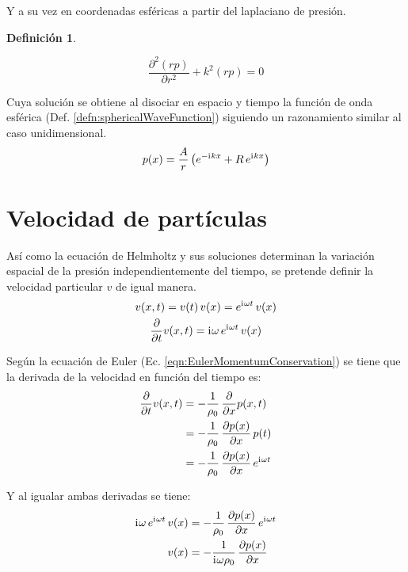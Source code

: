 \documentclass[a5paper,12pt,twoside]{book}
\newtheorem{defn}{{Definición}}[chapter]
\begin{document}
Y a su vez en coordenadas esféricas a partir del laplaciano de presión.

\begin{mdframed}[style=MyFrame1]
    \begin{defn}
        \label{defn:HelmholtzSpheric}
    \end{defn}
    \begin{equation*}
        \frac{\partial^2 (rp)}{\partial r^2} + k^2(rp) = 0
    \end{equation*}
\end{mdframed}

Cuya solución se obtiene al disociar en espacio y tiempo la función de onda esférica (Def. \ref{defn:sphericalWaveFunction}) siguiendo un razonamiento similar al caso unidimensional.
\begin{equation*}
    p(x) = \frac{A}{r} \left( e^{-\mathrm{i}\mkern1mu k x} + R \, e^{\mathrm{i}\mkern1mu k x} \right)
\end{equation*}


\section{Velocidad de partículas}

Así como la ecuación de Helmholtz y sus soluciones determinan la variación espacial de la presión independientemente del tiempo, se pretende definir la velocidad particular $v$ de igual manera.
\begin{gather*}
    v(x,t) = v(t) \, v(x) = e^{\mathrm{i}\mkern1mu \omega t} \, v(x)
    \\
    \frac{\partial}{\partial t} v(x,t) = \mathrm{i}\mkern1mu \omega \, e^{\mathrm{i}\mkern1mu \omega t} \, v(x)
\end{gather*}

Según la ecuación de Euler (Ec. \ref{eqn:EulerMomentumConservation}) se tiene que la derivada de la velocidad en función del tiempo es:
\begin{align*}
    \frac{\partial}{\partial t} v(x,t) &= - \frac{1}{\rho_0} \, \frac{\partial}{\partial x} p(x,t)
    \\
    &= - \frac{1}{\rho_0} \, \frac{\partial p(x)}{\partial x} \, p(t)
    \\
    &= - \frac{1}{\rho_0} \, \frac{\partial p(x)}{\partial x} \, e^{\mathrm{i}\mkern1mu \omega t}
\end{align*}

Y al igualar ambas derivadas se tiene:
\begin{align*}
    \mathrm{i}\mkern1mu \omega \, e^{\mathrm{i}\mkern1mu \omega t} \, v(x) &= - \frac{1}{\rho_0} \, \frac{\partial p(x)}{\partial x} \, e^{\mathrm{i}\mkern1mu \omega t}
    \\
    v(x) &= - \frac{1}{\mathrm{i}\mkern1mu \omega \rho_0} \, \frac{\partial p(x)}{\partial x}
\end{align*}
\end{document}
